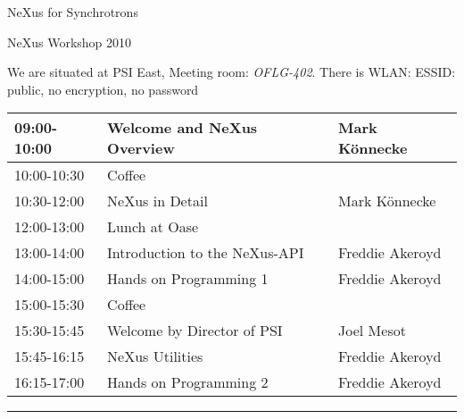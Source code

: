 \documentclass[a4paper]{article}\usepackage[dvips]{graphicx}
\begin{document}
\begin{center}


{\Huge NeXus for Synchrotrons }\\
\vspace{1cm}


{\Huge NeXus Workshop 2010 }

\end{center}


We are situated at PSI East, Meeting room: {\em OFLG-402}. There is WLAN: ESSID: public, no encryption, no password

\vspace{1cm}



\vspace{1cm}


\begin{table}[!ht]
\begin{tabular}{|p{2cm}|p{7cm}|p{4cm}|}
\hline
09:00-10:00 &Welcome and NeXus Overview& Mark K\"onnecke\\ \hline
10:00-10:30&Coffee& \\ \hline
10:30-12:00&NeXus in Detail&Mark K\"onnecke\\ \hline
12:00-13:00&Lunch at Oase& \\ \hline
13:00-14:00&Introduction to the NeXus-API&Freddie Akeroyd\\ \hline
14:00-15:00&Hands on Programming 1& Freddie Akeroyd\\ \hline
15:00-15:30&Coffee \\ \hline
15:30-15:45&Welcome by Director of PSI&Joel Mesot\\ \hline
15:45-16:15&NeXus Utilities&Freddie Akeroyd\\ \hline
16:15-17:00&Hands on Programming 2& Freddie Akeroyd\\ \hline
\end{tabular}
\end{table}
\rule{\textwidth}{1mm}




\end{document}
